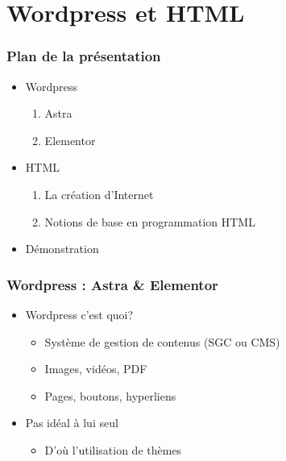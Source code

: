 \documentclass{beamer}
\begin{document}
\section{Wordpress et HTML}
\begin{frame}
        \frametitle{Plan de la présentation}
        \begin{itemize}
            \item<2-> Wordpress
                      \begin{enumerate}
                        \item Astra
                        \item Elementor
                      \end{enumerate}
            \item<3-> HTML
                      \begin{enumerate} 
                        \item La création d'Internet
                        \item Notions de base en programmation HTML
                      \end{enumerate}
            \item<4-> Démonstration
        \end{itemize}
    \end{frame}
    
    \begin{frame}
      \frametitle{Wordpress : Astra \& Elementor}
      \begin{itemize}
        \item<2-> Wordpress c'est quoi? 
          \begin{itemize}
            \item Système de gestion de contenus (SGC ou CMS)
            \item Images, vidéos, PDF
            \item Pages, boutons, hyperliens
          \end{itemize}
        \item<3-> Pas idéal à lui seul
          \begin{itemize}
            \item D'où l'utilisation de thèmes
          \end{itemize}
      \end{itemize}
    \end{frame}
    
\end{document}
